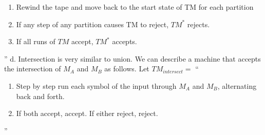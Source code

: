 \begin{problem}{8}
\begin{solution}
\begin{enumerate}
        \item Rewind the tape and move back to the start state of TM for each partition \\
        \item If any step of any partition causes TM to reject, $TM^*$ rejects. \\
        \item If all runs of $TM$ accept, $TM^*$ accepts.
      \end{enumerate}
    ''
    \br
    d. Intersection is very similar to union. We can describe a machine that accepts the intersection of $M_A$ and $M_B$ as follows.
    \br Let $TM_{intersect} =$ ``
      \begin{enumerate}
        \item Step by step run each symbol of the input through $M_A$ and $M_B$, alternating back and forth. \\
        \item If both accept, accept. If either reject, reject.
      \end{enumerate}
    ''
  \end{solution}
\end{problem}


